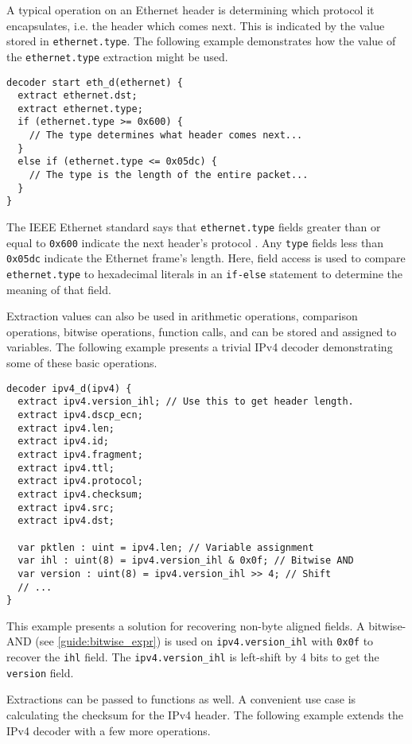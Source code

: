 A typical operation on an Ethernet header is determining which protocol
it encapsulates, i.e. the header which comes next. This is indicated
by the value stored in \texttt{ethernet.type}.
The following example demonstrates how the value of the \texttt{ethernet.type} 
extraction might be used.

\begin{lstlisting}
decoder start eth_d(ethernet) {
  extract ethernet.dst;
  extract ethernet.type;
  if (ethernet.type >= 0x600) {
    // The type determines what header comes next...
  }
  else if (ethernet.type <= 0x05dc) {
    // The type is the length of the entire packet...
  }
}
\end{lstlisting}

The IEEE Ethernet standard says that \texttt{ethernet.type} fields greater than 
or equal to \texttt{0x600} indicate the next header's protocol \cite{eth_std}. 
Any \texttt{type} fields less than \texttt{0x05dc} indicate the Ethernet frame's 
length. 
Here, field access is used to compare \texttt{ethernet.type} to 
hexadecimal literals in an \texttt{if-else} statement to determine the meaning of 
that field.

Extraction values can also be used in arithmetic operations, comparison 
operations, bitwise operations, function calls,
and can be stored and assigned to variables. The following example presents
a trivial IPv4 decoder demonstrating some of these basic operations.

\begin{lstlisting}
decoder ipv4_d(ipv4) {
  extract ipv4.version_ihl; // Use this to get header length.
  extract ipv4.dscp_ecn;
  extract ipv4.len;
  extract ipv4.id;
  extract ipv4.fragment;
  extract ipv4.ttl;
  extract ipv4.protocol;
  extract ipv4.checksum;
  extract ipv4.src;
  extract ipv4.dst;
  
  var pktlen : uint = ipv4.len; // Variable assignment
  var ihl : uint(8) = ipv4.version_ihl & 0x0f; // Bitwise AND
  var version : uint(8) = ipv4.version_ihl >> 4; // Shift
  // ...
}
\end{lstlisting}

This example presents a solution for recovering non-byte aligned
fields. A bitwise-AND (see \ref{guide:bitwise_expr}) is used on \texttt{ipv4.version\_ihl}
with \texttt{0x0f} to recover the \texttt{ihl} field. The 
\texttt{ipv4.version\_ihl} is left-shift by 4 bits to get the \texttt{version} field.

Extractions can be passed to functions as well. A convenient use case is 
calculating the checksum for the IPv4 header. 
The following example extends the IPv4 decoder with a few more operations.

